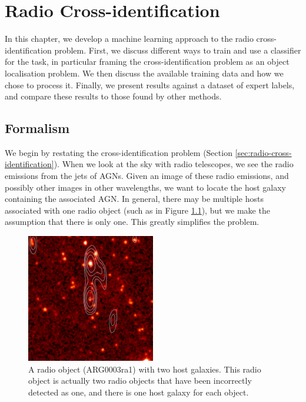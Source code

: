 
\chapter{Radio Cross-identification}
\label{cha:cross-identification}

  In this chapter, we develop a machine learning approach to the radio cross-%
  identification problem. First, we discuss different ways to train and use
  a classifier for the task, in particular framing the cross-identification
  problem as an object localisation problem. We then discuss the available
  training data and how we chose to process it. Finally, we present results
  against a dataset of expert labels, and compare these results to those found
  by other methods.

\section{Formalism}
\label{sec:cross-identification-formalism}

  We begin by restating the cross-identification problem (Section
  \ref{sec:radio-cross-identification}). When we look at the sky with radio
  telescopes, we see the radio emissions from the jets of AGNs. Given an image
  of these radio emissions, and possibly other images in other wavelengths, we
  want to locate the host galaxy containing the associated AGN. In general,
  there may be multiple hosts associated with one radio object (such as in
  Figure \ref{fig:two-hosts}), but we make the assumption that there is only
  one. This greatly simplifies the problem.

  \begin{figure}[!ht]
    \centering
    \includegraphics[width=0.5\textwidth]{images/CI0370C1_heatmap+contours.png}
    \caption{A radio object (ARG0003ra1) with two host galaxies. This radio
      object is actually two radio objects that have been incorrectly detected
      as one, and there is one host galaxy for each object.}
    \label{fig:two-hosts}
  \end{figure}

